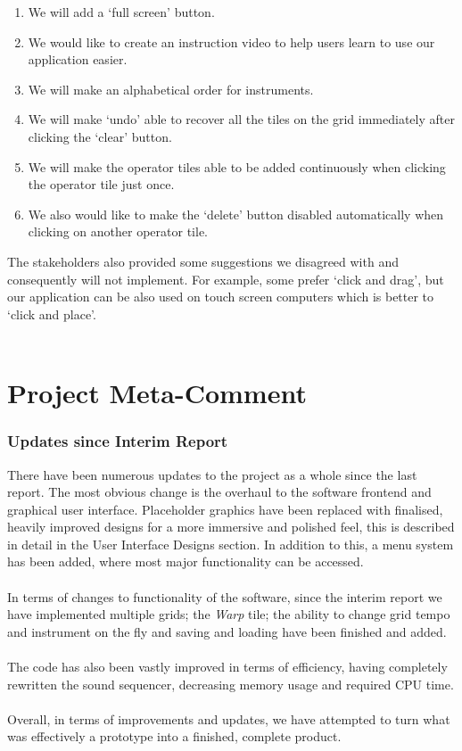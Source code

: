 \documentclass[10pt,a4paper]{article}
\begin{document}
\begin{enumerate}
\item We will add a ‘full screen’ button.

\item We would like to create an instruction video to help users learn to use our application easier.

\item We will make an alphabetical order for instruments.

\item We will make ‘undo’ able to recover all the tiles on the grid immediately after clicking the ‘clear’ button.

\item We will make the operator tiles able to be added continuously when clicking the operator tile just once.

\item We also would like to make the ‘delete’ button disabled automatically when clicking on another operator tile.
\end{enumerate}

The stakeholders also provided some suggestions we disagreed with and consequently will not implement. For example, some prefer ‘click and drag', but our application can be also used on touch screen computers which is better to ‘click and place’.\\
\\
\pagebreak

\part{Project Meta-Comment}
\section{Updates since Interim Report}
There have been numerous updates to the project as a whole since the last report. The most obvious change is the overhaul to the software frontend and graphical user interface. Placeholder graphics have been replaced with finalised, heavily improved designs for a more immersive and polished feel, this is described in detail in the User Interface Designs section. In addition to this, a menu system has been added, where most major functionality can be accessed. \\
\\
In terms of changes to functionality of the software, since the interim report we have implemented multiple grids; the \textit{Warp} tile; the ability to change grid tempo and instrument on the fly and saving and loading have been finished and added.\\
\\
The code has also been vastly improved in terms of efficiency, having completely rewritten the sound sequencer, decreasing memory usage and required CPU time.\\
\\
Overall, in terms of improvements and updates, we have attempted to turn what was effectively a prototype into a finished, complete product.\\
\end{document}
